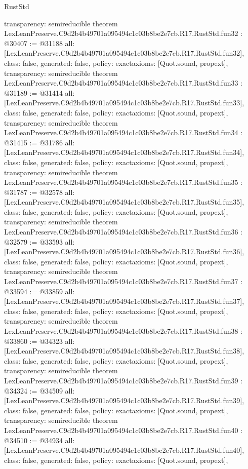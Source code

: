 \begin{lexlean}{RustStd}
\begin{coremodule}
{  transparency: semireducible
}
theorem LexLeanPreserve.C9d2b4b49701a095494c1c03b8be2e7cb.R17.RustStd.fun32 : @30407 := @31188 {
  all: [LexLeanPreserve.C9d2b4b49701a095494c1c03b8be2e7cb.R17.RustStd.fun32],
  class: false,
  generated: false,
  policy: exact{axioms: [Quot.sound, propext]},
  transparency: semireducible
}
theorem LexLeanPreserve.C9d2b4b49701a095494c1c03b8be2e7cb.R17.RustStd.fun33 : @31189 := @31414 {
  all: [LexLeanPreserve.C9d2b4b49701a095494c1c03b8be2e7cb.R17.RustStd.fun33],
  class: false,
  generated: false,
  policy: exact{axioms: [Quot.sound, propext]},
  transparency: semireducible
}
theorem LexLeanPreserve.C9d2b4b49701a095494c1c03b8be2e7cb.R17.RustStd.fun34 : @31415 := @31786 {
  all: [LexLeanPreserve.C9d2b4b49701a095494c1c03b8be2e7cb.R17.RustStd.fun34],
  class: false,
  generated: false,
  policy: exact{axioms: [Quot.sound, propext]},
  transparency: semireducible
}
theorem LexLeanPreserve.C9d2b4b49701a095494c1c03b8be2e7cb.R17.RustStd.fun35 : @31787 := @32578 {
  all: [LexLeanPreserve.C9d2b4b49701a095494c1c03b8be2e7cb.R17.RustStd.fun35],
  class: false,
  generated: false,
  policy: exact{axioms: [Quot.sound, propext]},
  transparency: semireducible
}
theorem LexLeanPreserve.C9d2b4b49701a095494c1c03b8be2e7cb.R17.RustStd.fun36 : @32579 := @33593 {
  all: [LexLeanPreserve.C9d2b4b49701a095494c1c03b8be2e7cb.R17.RustStd.fun36],
  class: false,
  generated: false,
  policy: exact{axioms: [Quot.sound, propext]},
  transparency: semireducible
}
theorem LexLeanPreserve.C9d2b4b49701a095494c1c03b8be2e7cb.R17.RustStd.fun37 : @33594 := @33859 {
  all: [LexLeanPreserve.C9d2b4b49701a095494c1c03b8be2e7cb.R17.RustStd.fun37],
  class: false,
  generated: false,
  policy: exact{axioms: [Quot.sound, propext]},
  transparency: semireducible
}
theorem LexLeanPreserve.C9d2b4b49701a095494c1c03b8be2e7cb.R17.RustStd.fun38 : @33860 := @34323 {
  all: [LexLeanPreserve.C9d2b4b49701a095494c1c03b8be2e7cb.R17.RustStd.fun38],
  class: false,
  generated: false,
  policy: exact{axioms: [Quot.sound, propext]},
  transparency: semireducible
}
theorem LexLeanPreserve.C9d2b4b49701a095494c1c03b8be2e7cb.R17.RustStd.fun39 : @34324 := @34509 {
  all: [LexLeanPreserve.C9d2b4b49701a095494c1c03b8be2e7cb.R17.RustStd.fun39],
  class: false,
  generated: false,
  policy: exact{axioms: [Quot.sound, propext]},
  transparency: semireducible
}
theorem LexLeanPreserve.C9d2b4b49701a095494c1c03b8be2e7cb.R17.RustStd.fun40 : @34510 := @34934 {
  all: [LexLeanPreserve.C9d2b4b49701a095494c1c03b8be2e7cb.R17.RustStd.fun40],
  class: false,
  generated: false,
  policy: exact{axioms: [Quot.sound, propext]},
}
\end{coremodule}
\end{lexlean}
